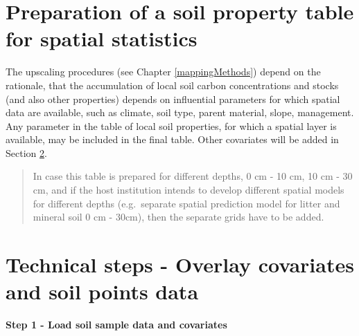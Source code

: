 \documentclass[10pt,b5paper,]{book}
\newenvironment{Shaded}{\begin{snugshade}}{\end{snugshade}}
\newcommand{\CommentTok}[1]{\textcolor[rgb]{0.56,0.35,0.01}{\textit{#1}}}
\newcommand{\DataTypeTok}[1]{\textcolor[rgb]{0.13,0.29,0.53}{#1}}
\newcommand{\KeywordTok}[1]{\textcolor[rgb]{0.13,0.29,0.53}{\textbf{#1}}}
\newcommand{\NormalTok}[1]{#1}
\newcommand{\OtherTok}[1]{\textcolor[rgb]{0.56,0.35,0.01}{#1}}
\newcommand{\StringTok}[1]{\textcolor[rgb]{0.31,0.60,0.02}{#1}}
\theoremstyle{definition}
\theoremstyle{definition}
\theoremstyle{definition}
\theoremstyle{remark}
\begin{document}
\hypertarget{preparation-of-a-soil-property-table-for-spatial-statistics}{%
\section{Preparation of a soil property table for spatial
statistics}\label{preparation-of-a-soil-property-table-for-spatial-statistics}}

The upscaling procedures (see Chapter \ref{mappingMethods}) depend on
the rationale, that the accumulation of local soil carbon concentrations
and stocks (and also other properties) depends on influential parameters
for which spatial data are available, such as climate, soil type, parent
material, slope, management. Any parameter in the table of local soil
properties, for which a spatial layer is available, may be included in
the final table. Other covariates will be added in Section
\ref{overlay-soil-covariates}.

\begin{quote}
In case this table is prepared for different depths, 0 cm - 10 cm, 10 cm
- 30 cm, and if the host institution intends to develop different
spatial models for different depths (e.g.~separate spatial prediction
model for litter and mineral soil 0 cm - 30cm), then the separate grids
have to be added.
\end{quote}

\hypertarget{overlay-soil-covariates}{%
\section{Technical steps - Overlay covariates and soil points
data}\label{overlay-soil-covariates}}

\textbf{Step 1 - Load soil sample data and covariates}

\begin{Shaded}
\end{Shaded}
\end{document}
